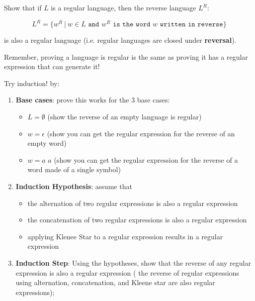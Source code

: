 \documentclass[12pt]{article}
\newenvironment{exercise}[2][Exercise]{\begin{trivlist}
\item[\hskip \labelsep {\bfseries #1}\hskip \labelsep {\bfseries #2.}]}{\end{trivlist}}
\begin{document}
\clearpage

\begin{exercise}{4}

Show that if $L$ is a regular language, then the reverse language $L^R$:

$$L^R = \{w^R \ | \ w\in L \texttt{ and } w^R \texttt{ is the word } w \texttt{ written in reverse}\}$$

is also a regular language (i.e. regular languages are closed under \textbf{reversal}).

Remember, proving a language is regular is the same as proving it has a regular expression that can generate it!

\begin{tip}
Try induction! by:
\begin{enumerate}
    \item \textbf{Base cases}: prove this works for the 3 base cases:
    \begin{itemize}
        \item $L =\emptyset$ (show the reverse of an empty language is regular)
        \item $w=\epsilon$ (show you can get the regular expression for the reverse of an empty word)
        \item $w=a$  $a$ (show you can get the regular expression for the reverse of a word made of a single symbol)
    \end{itemize}
    \item\textbf{ Induction Hypothesis}: assume that  
    \begin{itemize}
        \item the alternation of two regular expressions is also a regular expression
        \item the concatenation of two regular expressions is also a regular expression
        \item applying Klenee Star to a regular expression results in a regular expression
    \end{itemize}

    \item \textbf{Induction Step}: Using the hypotheses, show that the reverse of any regular expression is also a regular expression (
    the reverse of regular expressions using alternation, concatenation, and Kleene star are also regular expressions); 
\end{enumerate}
\end{tip}

\end{exercise}
\end{document}

